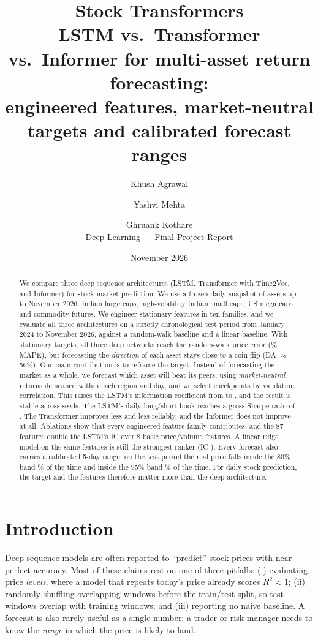 \documentclass[11pt,a4paper]{article}
\title{\textbf{Stock Transformers}\\[4pt]\large LSTM vs.\ Transformer vs.\ Informer for multi-asset return forecasting:\\engineered features, market-neutral targets and calibrated forecast ranges}
\author{Khush Agrawal \and Yashvi Mehta \and Ghruank Kothare\\[2pt]\small Deep Learning --- Final Project Report}
\date{November 2026}
\begin{document}
\maketitle

\begin{abstract}
We compare three deep sequence architectures (LSTM, Transformer with Time2Vec, and Informer) for stock-market prediction.
We use a frozen daily snapshot of \NAssets{} assets up to November 2026:
Indian large caps, high-volatility Indian small caps, US mega caps and commodity futures.
We engineer \NFeat{} stationary features in ten families, and we evaluate all three architectures on a strictly chronological test period
from January 2024 to November 2026, against a random-walk baseline and a linear baseline.
With stationary targets, all three deep networks reach the random-walk price error (\NaiveMAPE\% MAPE), but forecasting the
\emph{direction} of each asset stays close to a coin flip (DA $\approx$ 50\%).
Our main contribution is to reframe the target. Instead of forecasting the market as a whole, we forecast which asset will beat its peers,
using \emph{market-neutral} returns demeaned within each region and day, and we select checkpoints by validation correlation.
This raises the LSTM's information coefficient from \LSTMRawIC{} to \LSTMXsIC{}, and the result is stable across seeds.
The LSTM's daily long/short book reaches a gross Sharpe ratio of \LSTMXsLS{}. The Transformer improves less and less reliably,
and the Informer does not improve at all. Ablations show that every engineered feature family contributes, and the 87 features double
the LSTM's IC over 8 basic price/volume features. A linear ridge model on the same features is still the strongest ranker (IC \RidgeXsIC{}).
Every forecast also carries a calibrated 5-day range: on the test period the real price falls inside the 80\% band \ConeEighty\% of the time
and inside the 95\% band \ConeNinetyFive\% of the time.
For daily stock prediction, the target and the features therefore matter more than the deep architecture.
\end{abstract}

\section{Introduction}
Deep sequence models are often reported to ``predict'' stock prices with near-perfect accuracy.
Most of these claims rest on one of three pitfalls:
(i) evaluating price \emph{levels}, where a model that repeats today's price already scores $R^2\approx 1$;
(ii) randomly shuffling overlapping windows before the train/test split, so test windows overlap with training windows; and
(iii) reporting no naive baseline. A forecast is also rarely useful as a single number: a trader or risk manager needs to know
the \emph{range} in which the price is likely to land.
\end{document}
